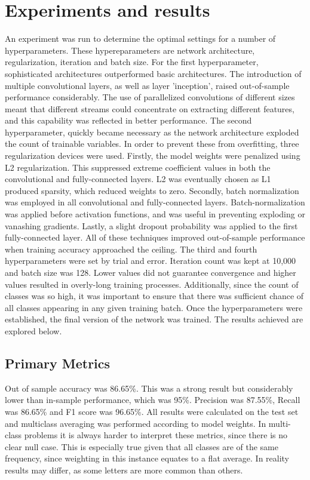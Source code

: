 \documentclass[fleqn,10pt]{SelfArx} %
\begin{document}
\section{Experiments and results}
An experiment was run to determine the optimal settings for a number of hyperparameters. These hypereparameters are network architecture, regularization, iteration and batch size.
\newline
For the first hyperparameter, sophisticated architectures outperformed basic architectures. The introduction of multiple convolutional layers, as well as layer 'inception', raised out-of-sample performance considerably. The use of parallelized convolutions of different sizes meant that different streams could concentrate on extracting different features, and this capability was reflected in better performance.
\newline
The second hyperparameter, quickly became necessary as the network architecture exploded the count of trainable variables. In order to prevent these from overfitting, three regularization devices were used. Firstly, the model weights were penalized using L2 regularization. This suppressed extreme coefficient values in both the convolutional and fully-connected layers. L2 was eventually chosen as L1 produced sparsity, which reduced weights to zero. Secondly, batch normalization was employed in all convolutional and fully-connected layers. Batch-normalization was applied before activation functions, and was useful in preventing exploding or vanashing gradients. Lastly, a slight dropout probability was applied to the first fully-connected layer. All of these techniques improved out-of-sample performance when training accuracy approached the ceiling.
\newline
The third and fourth hyperparameters were set by trial and error. Iteration count was kept at 10,000 and batch size was 128. Lower values did not guarantee convergence and higher values resulted in overly-long training processes. Additionally, since the count of classes was so high, it was important to ensure that there was sufficient chance of all classes appearing in any given training batch.
\newline
Once the hyperparameters were established, the final version of the network was trained. The results achieved are explored below.

\subsection{Primary Metrics}
Out of sample accuracy was 86.65\%. This was a strong result but considerably lower than in-sample performance, which was 95\%. Precision was 87.55\%, Recall was 86.65\% and F1 score was 96.65\%. All results were calculated on the test set and multiclass averaging was performed according to model weights. In multi-class problems it is always harder to interpret these metrics, since there is no clear null case. This is especially true given that all classes are of the same frequency, since weighting in this instance equates to a flat average. In reality results may differ, as some letters are more common than others.
\end{document}
